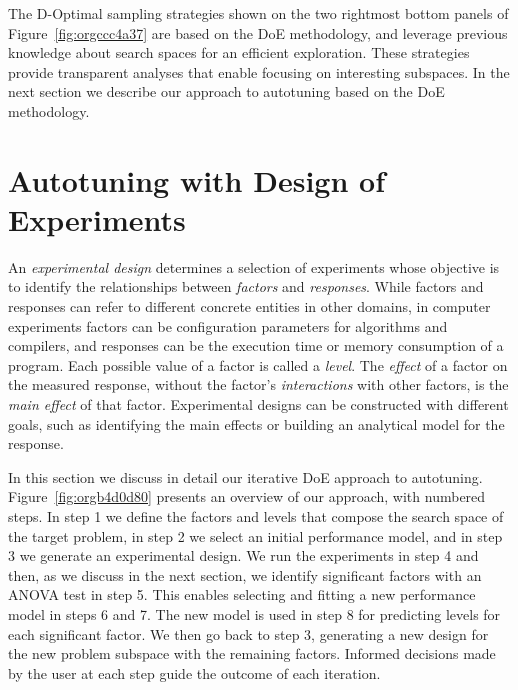 \documentclass[conference]{IEEEtran}
\begin{document}
The D-Optimal  sampling strategies shown on  the two rightmost bottom  panels of
Figure~\ref{fig:orgccc4a37} are  based on  the DoE methodology,  and leverage
previous  knowledge about  search spaces  for an  efficient exploration.   These
strategies  provide transparent  analyses  that enable  focusing on  interesting
subspaces. In the  next section we describe our approach  to autotuning based on
the DoE methodology.
\section{Autotuning with Design of Experiments}
\label{sec:org308a81f}
An \emph{experimental design} determines a  selection of experiments whose objective is
to identify the  relationships between \emph{factors} and \emph{responses}.  While factors and
responses can refer to different concrete entities in other domains, in computer
experiments  factors   can  be  configuration  parameters   for  algorithms  and
compilers, and  responses can be the  execution time or memory  consumption of a
program. Each  possible value of  a factor  is called a  \emph{level}. The \emph{effect}  of a
factor on  the measured response,  without the factor's \emph{interactions}  with other
factors,  is  the \emph{main  effect}  of  that  factor.  Experimental designs  can  be
constructed  with different  goals,  such  as identifying  the  main effects  or
building an analytical model for the response.

In this section  we discuss in detail our iterative  DoE approach to autotuning.
Figure~\ref{fig:orgb4d0d80}  presents  an  overview   of  our  approach,  with
numbered steps.  In step  1 we define  the factors and  levels that  compose the
search space of the  target problem, in step 2 we  select an initial performance
model, and in step 3 we generate  an experimental design. We run the experiments
in step 4 and  then, as we discuss in the next  section, we identify significant
factors with an ANOVA  test in step 5. This enables selecting  and fitting a new
performance  model in  steps 6  and  7. The  new model  is  used in  step 8  for
predicting  levels for  each significant  factor.  We then  go back  to step  3,
generating a new design for the new problem subspace with the remaining factors.
Informed decisions  made by  the user  at each  step guide  the outcome  of each
iteration.
\end{document}
